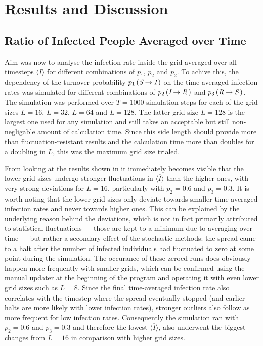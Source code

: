 \section{Results and Discussion}

\subsection{Ratio of Infected People Averaged over Time}

Aim was now to analyse the infection rate inside the grid averaged over all timesteps $\overline{\langle I\rangle}$ for different combinations of $p_1$, $p_2$ and $p_2$. To achive this, the dependency of the 
turnover probability $p_1\left(\textit{S}\rightarrow\textit{I}\,\right)$ on the time-averaged infection rates was simulated for different combinations of $p_2\left(\textit{I}\rightarrow\textit{R}\,\right)$
and $p_3\left(\textit{R}\rightarrow\textit{S}\,\right)$. The simulation was performed over $T=1000$ simulation steps for each of the grid sizes $L=16$, $L=32$, $L=64$ and $L=128$.
The latter grid size $L=128$ is the largest one used for any simulation and still takes an acceptable but still non-negligable amount of calculation time.
Since this side length should provide more than fluctuation-resistant results and the calculation time more than doubles for a doubling in $L$, this was the maximum grid size trialed.

From looking at the results shown in  it immediately becomes visible that the lower grid sizes undergo stronger fluctuations in $\overline{\langle I\rangle}$ than the higher ones, 
with very strong deviations for $L=16$, particularly with $p_2=0.6$ and $p_3=0.3$. It is worth noting that the lower grid sizes only deviate towards smaller time-averaged infection rates and never towards higher ones. 
This can be explained by the underlying reason behind the deviations, which is not in fact primarily attributed to statistical fluctuations --- those are kept to a minimum due to averaging over time --- but
rather a secondary effect of the stochastic methods: the spread came to a halt after the number of infected individuals had fluctuated to zero at some point during the simulation. The occurance of these zeroed runs does
obviously happen more frequently with smaller grids, which can be confirmed using the manual updater at the beginning of the program and operating it with even lower grid sizes such as $L=8$.
Since the final time-averaged infection rate also correlates with the timestep where the spread eventually stopped (and earlier halts are more likely with lower infection rates), stronger outliers also follow as more frequent 
for low infection rates. Consequently the simulation ran with $p_2=0.6$ and $p_3=0.3$ and therefore the lowest $\overline{\langle I\rangle}$, also underwent the biggest changes from $L=16$ in comparison with higher grid sizes.


